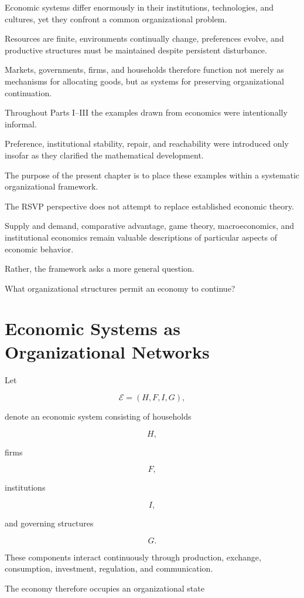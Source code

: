 \documentclass[11pt,oneside]{book}
\numberwithin{equation}{chapter}
\theoremstyle{definition}
\theoremstyle{plain}
\begin{document}
Economic systems differ enormously in their institutions, technologies, and
cultures, yet they confront a common organizational problem.

Resources are finite, environments continually change, preferences evolve,
and productive structures must be maintained despite persistent
disturbance.

Markets, governments, firms, and households therefore function not merely
as mechanisms for allocating goods, but as systems for preserving
organizational continuation.

Throughout Parts I--III the examples drawn from economics were
intentionally informal.

Preference, institutional stability, repair, and reachability were
introduced only insofar as they clarified the mathematical development.

The purpose of the present chapter is to place these examples within a
systematic organizational framework.

The RSVP perspective does not attempt to replace established economic
theory.

Supply and demand, comparative advantage, game theory, macroeconomics, and
institutional economics remain valuable descriptions of particular aspects
of economic behavior.

Rather, the framework asks a more general question.

What organizational structures permit an economy to continue?

\section{Economic Systems as Organizational Networks}

Let

\[
\mathcal E
=
(H,F,I,G),
\]

denote an economic system consisting of households

\[
H,
\]

firms

\[
F,
\]

institutions

\[
I,
\]

and governing structures

\[
G.
\]

These components interact continuously through production, exchange,
consumption, investment, regulation, and communication.

The economy therefore occupies an organizational state
\end{document}
